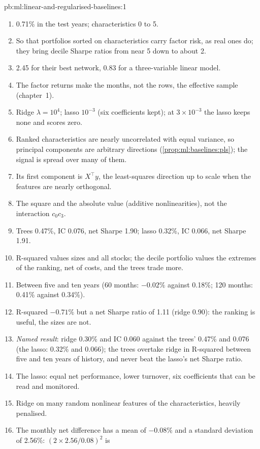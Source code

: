 \begin{solution}{pb:ml:linear-and-regularised-baselines:1}
\begin{enumerate}
\item 0.71\% in the test years; characteristics 0 to 5.
\item So that portfolios sorted on characteristics carry factor risk, as real ones do; they bring decile Sharpe ratios
from near 5 down to about 2.
\item 2.45 for their best network, 0.83 for a three-variable linear model.
\item The factor returns make the months, not the rows, the effective sample (chapter~1).
\item Ridge $\lambda = 10^4$; lasso $10^{-3}$ (six coefficients kept); at $3\times10^{-3}$ the lasso keeps none and scores
zero.
\item Ranked characteristics are nearly uncorrelated with equal variance, so principal components are arbitrary
directions (\cref{prop:ml:baselines:pls}); the signal is spread over many of them.
\item Its first component is $X^\top y$, the least-squares direction up to scale when the features are nearly orthogonal.
\item The square and the absolute value (additive nonlinearities), not the interaction $c_0c_3$.
\item Trees 0.47\%, IC 0.076, net Sharpe 1.90; lasso 0.32\%, IC 0.066, net Sharpe 1.91.
\item R-squared values sizes and all stocks; the decile portfolio values the extremes of the ranking, net of costs, and the
trees trade more.
\item Between five and ten years (60 months: $-0.02\%$ against 0.18\%; 120 months: 0.41\% against 0.34\%).
\item R-squared $-0.71\%$ but a net Sharpe ratio of 1.11 (ridge 0.90): the ranking is useful, the sizes are not.
\item \emph{Named result}: ridge 0.30\% and IC 0.060 against the trees' 0.47\% and 0.076 (the lasso: 0.32\% and 0.066);
the trees overtake ridge in R-squared between five and ten years of history, and never beat the lasso's net Sharpe
ratio.
\item The lasso: equal net performance, lower turnover, six coefficients that can be read and monitored.
\item Ridge on many random nonlinear features of the characteristics, heavily penalised.
\item The monthly net difference has a mean of $-0.08\%$ and a standard deviation of 2.56\%: $(2\times2.56/0.08)^2$ is

\end{enumerate}
\end{solution}
